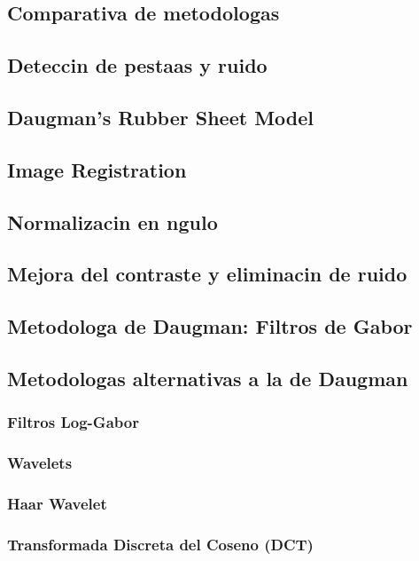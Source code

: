 \subsection{Comparativa de metodologas}
\subsection{Deteccin de pestaas y ruido}


\label{sec:normalizacion}
\subsection{Daugman's Rubber Sheet Model}
\subsection{Image Registration}
\subsection{Normalizacin en ngulo}
\subsection{Mejora del contraste y eliminacin de ruido}


\label{sec:codificacion}
\subsection{Metodologa de Daugman: Filtros de Gabor}
\subsection{Metodologas alternativas a la de Daugman}
\subsubsection{Filtros Log-Gabor} \label{subsubsec:filtrosLogGabor}
\subsubsection{Wavelets}
\subsubsection{Haar Wavelet}
\subsubsection{Transformada Discreta del Coseno (DCT)}
